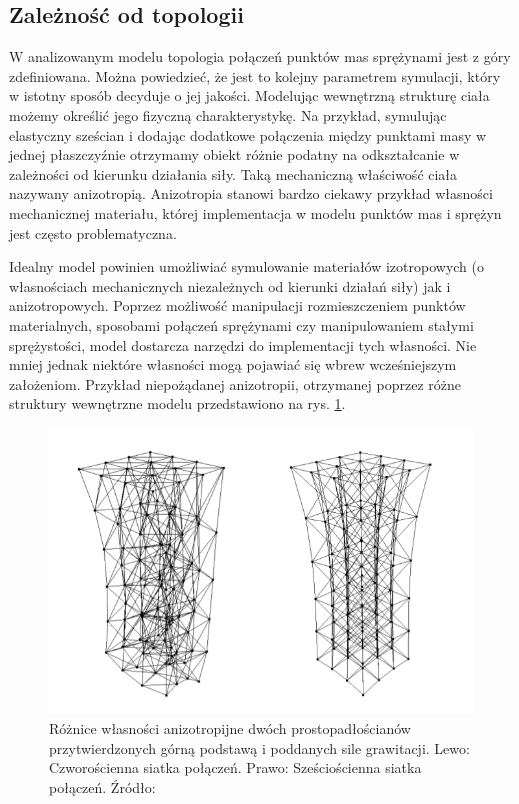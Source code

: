 \subsection{Zależność od topologii}
W analizowanym modelu topologia połączeń punktów mas sprężynami jest z góry
zdefiniowana. Można powiedzieć, że jest to kolejny parametrem symulacji, który w
istotny sposób decyduje o jej jakości. Modelując wewnętrzną strukturę ciała możemy określić jego fizyczną
charakterystykę. Na przykład, symulując elastyczny sześcian i dodając dodatkowe
połączenia między punktami masy w jednej płaszczyźnie otrzymamy obiekt różnie
podatny na odkształcanie w zależności od kierunku działania siły. Taką
mechaniczną właściwość ciała nazywany anizotropią. Anizotropia stanowi bardzo
ciekawy przykład własności mechanicznej materiału, której implementacja w modelu
punktów mas i sprężyn jest często problematyczna. 

Idealny model powinien umożliwiać symulowanie materiałów izotropowych (o
		własnościach mechanicznych niezależnych od kierunki działań siły) jak i
anizotropowych. Poprzez możliwość manipulacji rozmieszczeniem punktów
materialnych, sposobami połączeń sprężynami czy manipulowaniem stałymi
sprężystości, model dostarcza narzędzi do implementacji tych własności. Nie
mniej jednak niektóre własności mogą pojawiać się wbrew wcześniejszym
założeniom. Przykład niepożądanej anizotropii, otrzymanej poprzez różne
struktury wewnętrzne modelu przedstawiono na rys. \ref{anizotropia}.

\begin{figure}[ht]
\centering
\includegraphics[scale=0.5]{images/anisotropy.png}
\caption{Różnice własności anizotropijne dwóch prostopadłościanów
	przytwierdzonych górną podstawą i poddanych sile grawitacji. Lewo:
		Czworościenna siatka połączeń. Prawo: Sześciościenna siatka połączeń. Źródło: \cite{ca}}
\label{anizotropia}
\end{figure}

